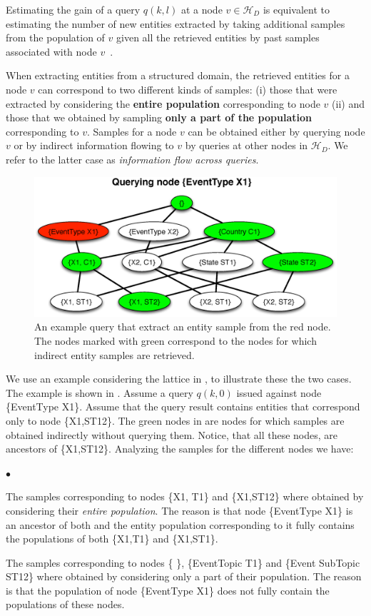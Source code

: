 \documentclass{vldb}
\newcommand{\squishlist}{
   \begin{list}{$\bullet$}
    {
      \setlength{\itemsep}{0pt}
      \setlength{\parsep}{3pt}
      \setlength{\topsep}{3pt}
      \setlength{\partopsep}{0pt}
      \setlength{\leftmargin}{1.5em}
      \setlength{\labelwidth}{1em}
      \setlength{\labelsep}{0.5em} } }
\newcommand{\squishend}{
    \end{list}  }
\newcommand{\hierarchy}{\mathcal{H}_D}
\begin{document}
Estimating the gain of a query $q(k,l)$ at a node $v \in \hierarchy$ is equivalent to estimating the number of new entities extracted by taking additional samples from the population of $v$ given all the retrieved entities by past samples associated with node $v$~\cite{trushkowsky:2013}. 

When extracting entities from a structured domain, the retrieved entities for a node $v$ can correspond to two different kinds of samples: (i) those that were extracted by considering the {\bf entire population} corresponding to node $v$ (ii) and those that we obtained by sampling {\bf only a part of the population} corresponding to $v$. Samples for a node $v$ can be obtained either by querying node $v$ or by indirect information flowing to $v$ by queries at other nodes in $\hierarchy$. We refer to the latter case as {\em information flow across queries}. 
\begin{figure}[h]
	\begin{center}
	\includegraphics[clip,scale=0.32]{figs/exampleQuery.eps}
	\caption{An example query that extract an entity sample from the red node. The nodes marked with green correspond to the nodes for which indirect entity samples are retrieved.}
	\label{fig:query}
	\end{center}
	\vspace{-10pt}
\end{figure}

We use an example considering the lattice in , to illustrate these the two cases. The example is shown in . Assume a query $q(k,0)$ issued against node \{EventType X1\}. Assume that the query result contains entities that correspond only to node \{X1,ST12\}. The green nodes in  are nodes for which samples are obtained indirectly without querying them. Notice, that all these nodes, are ancestors of \{X1,ST12\}. Analyzing the samples for the different nodes we have:
\squishlist
\item The samples corresponding to nodes \{X1, T1\} and \{X1,ST12\} where obtained by considering their {\em entire population}. The reason is that node \{EventType X1\} is an ancestor of both and the entity population corresponding to it fully contains the populations of both \{X1,T1\} and \{X1,ST1\}. 
\item The samples corresponding to nodes \{ \}, \{EventTopic T1\} and \{Event SubTopic ST12\} where obtained by considering only a part of their population. The reason is that the population of node \{EventType X1\} does not fully contain the populations of these nodes. 
\squishend
\end{document}
